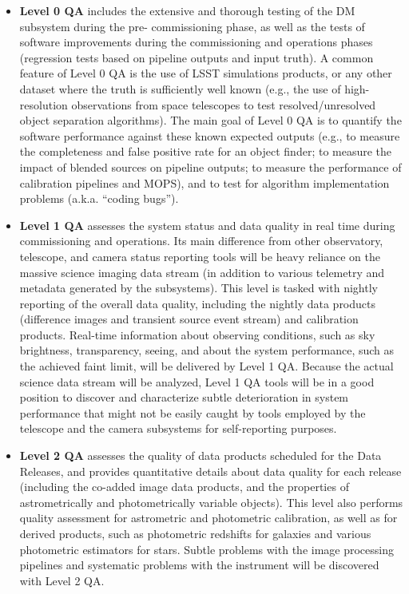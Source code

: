 \documentclass[12pt]{article}
\begin{document}
\begin{itemize}
    \item {\bf Level 0 QA} includes the extensive and thorough testing of the DM subsystem during the pre- commissioning phase, as well as the tests of software improvements during the commissioning and operations phases (regression tests based on pipeline outputs and input truth). A common feature of Level 0 QA is the use of LSST simulations products, or any other dataset where the truth is sufficiently well known (e.g., the use of high-resolution observations from space telescopes to test resolved/unresolved object separation algorithms). The main goal of Level 0 QA is to quantify the software performance against these known expected outputs (e.g., to measure the completeness and false positive rate for an object finder; to measure the impact of blended sources on pipeline outputs; to measure the performance of calibration pipelines and MOPS), and to test for algorithm implementation problems (a.k.a. “coding bugs”).
    
    \item {\bf Level 1 QA} assesses the system status and data quality in real time during commissioning and operations. Its main difference from other observatory, telescope, and camera status reporting tools will be heavy reliance on the massive science imaging data stream (in addition to various telemetry and metadata generated by the subsystems). This level is tasked with nightly reporting of the overall data quality, including the nightly data products (difference images and transient source event stream) and calibration products. Real-time information about observing conditions, such as sky brightness, transparency, seeing, and about the system performance, such as the achieved faint limit, will be delivered by Level 1 QA\@. Because the actual science data stream will be analyzed, Level 1 QA tools will be in a good position to discover and characterize subtle deterioration in system performance that might not be easily caught by tools employed by the telescope and the camera subsystems for self-reporting purposes.

    \item {\bf Level 2 QA} assesses the quality of data products scheduled for the Data Releases, and provides quantitative details about data quality for each release (including the co-added image data products, and the properties of astrometrically and photometrically variable objects). This level also performs quality assessment for astrometric and photometric calibration, as well as for derived products, such as photometric redshifts for galaxies
      and various photometric estimators for stars. Subtle problems with the image processing pipelines and systematic problems with the instrument will be discovered with Level 2 QA.
    

\end{itemize}
\end{document}
